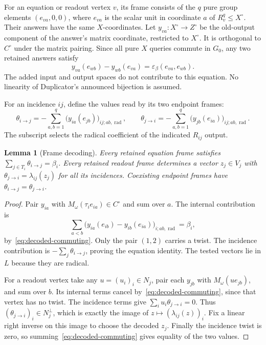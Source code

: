 \documentclass[11pt]{article}
\newcommand{\eps}{\varepsilon}
\DeclareMathOperator{\rad}{rad}
\newtheorem{lemma}[theorem]{Lemma}
\theoremstyle{definition}
\theoremstyle{remark}
\numberwithin{equation}{section}
\begin{document}
For an equation or readout vertex $v$, its frame consists of the $q$
pure group elements $(e_{va},0,0)$, where $e_{va}$ is the scalar unit
in coordinate $a$ of $R_v^q\le X^\circ$. Their answers have the same
$X$-coordinates. Let $y_{va}:X^\circ\to Z^\circ$ be the old-output
component of the answer's matrix coordinate, restricted to $X^\circ$.
It is orthogonal to $C^\circ$ under the matrix pairing. Since all pure
$X$ queries commute in $G_0$, any two retained answers satisfy
\begin{equation}
 y_{va}(e_{wb})-y_{wb}(e_{va})
       =\eps_\beta(e_{va},e_{wb}).
 \label{eq:decoded-commuting}
\end{equation}
The added input and output spaces do not contribute to this equation.
No linearity of Duplicator's announced bijection is assumed.

For an incidence $ij$, define the values read by its two endpoint frames:
\begin{equation}
 \theta_{i\to j}=-\sum_{a,b=1}^q
       \bigl(y_{ia}(e_{jb})\bigr)_{ij;ab,\rad},\qquad
 \theta_{j\to i}=-\sum_{a,b=1}^q
       \bigl(y_{jb}(e_{ia})\bigr)_{ij;ab,\rad}.
 \label{eq:theta}
\end{equation}
The subscript selects the radical coefficient of the indicated
$R_{ij}$ output.

\begin{lemma}[Frame decoding]
\label{lem:decoding}
Every retained equation frame satisfies
$\sum_{j\in T_i}\theta_{i\to j}=\beta_i$.
Every retained readout frame determines a vector $z_j\in V_j$ with
$\theta_{j\to i}=\lambda_{ij}(z_j)$ for all its incidences.
Coexisting endpoint frames have $\theta_{i\to j}=\theta_{j\to i}$.
\end{lemma}
\begin{proof}
Pair $y_{ia}$ with $M_\omega(\tau_i e_{ia})\in C^\circ$ and sum over $a$.
The internal contribution is
\[
 \sum_{a<b}\bigl(y_{ia}(e_{ib})-y_{ib}(e_{ia})\bigr)_{i;ab,\rad}
       =\beta_i,
\]
by~\eqref{eq:decoded-commuting}. Only the pair $(1,2)$ carries a twist.
The incidence contribution is $-\sum_j\theta_{i\to j}$, proving the
equation identity. The tested vectors lie in $L$ because they are radical.

For a readout vertex take any $u=(u_i)_i\in N_j$, pair each $y_{jb}$
with $M_\omega(u e_{jb})$, and sum over $b$. Its internal terms cancel
by~\eqref{eq:decoded-commuting}, since that vertex has no twist.
The incidence terms give $\sum_i u_i\theta_{j\to i}=0$.
Thus $(\theta_{j\to i})_i\in N_j^\perp$, which is exactly the image of
$z\mapsto(\lambda_{ij}(z))_i$. Fix a linear right inverse on this
image to choose the decoded $z_j$. Finally the incidence twist is zero,
so summing~\eqref{eq:decoded-commuting} gives equality of the two values.
\end{proof}
\end{document}
